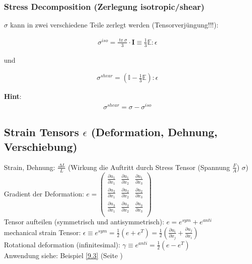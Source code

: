 	\subsubsection{Stress Decomposition (Zerlegung isotropic/shear)}
	\label{stressdecomposition}
	
	$\sigma$ kann in zwei verschiedene Teile zerlegt werden (Tensorverjüngung!!!):
	
	\begin{align}
		\sigma^{iso}=\frac{\operatorname{tr} \sigma}{3} \cdot \mathbf{I} \equiv
		\frac{1}{3} \mathbb{E} : \epsilon
	\end{align}
	
	und
	
	\begin{align}
		\sigma^{shear}= \left(\mathbb{I}- \frac{1}{3}\mathbb{E} \right) : \epsilon
	\end{align}
	
	\textbf{Hint}:
	\begin{align}
		\sigma^{shear} = \sigma -\sigma^{iso}
	\end{align}
	
	
	
	
	
	
	\subsection{Strain Tensors $\epsilon$ (Deformation, Dehnung, Verschiebung)}
	Strain, Dehnung: $\frac{\Delta L}{L}$ (Wirkung die Auftritt durch Stress
	Tensor (Spannung $\frac{F}{A}$) $\sigma$)\\
	Gradient der Deformation: $e = \begin{pmatrix}
	\frac{\partial u_1}{\partial x_1} & \frac{\partial u_1}{\partial x_2} &
	\frac{\partial u_1}{\partial x_3}\\
	\frac{\partial u_2}{\partial x_1} & \frac{\partial u_2}{\partial x_2} &
	\frac{\partial u_2}{\partial x_3}\\
	\frac{\partial u_3}{\partial x_1} & \frac{\partial u_3}{\partial x_2} &
	\frac{\partial u_3}{\partial x_3}\\
	\end{pmatrix}$\\
	Tensor aufteilen (symmetrisch und antisymmetrisch): $e = e^{sym} + e^{anti}$\\
	mechanical strain Tensor: $\epsilon \equiv e^{sym} = \frac{1}{2} (e + e^T) =
	\frac{1}{2} (\frac{\partial u_i}{\partial x_j} + \frac{\partial
		u_j}{\partial x_i})$\\
	Rotational deformation (infinitesimal): $\gamma \equiv e^{anti} = \frac{1}{2} (e
	- e^T)$\\
	Anwendung siehe: Beispiel \ref{9.3} (Seite \pageref{9.3})
	
